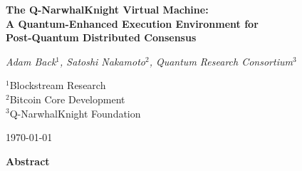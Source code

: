 \documentclass[11pt]{article}
\begin{document}
\begin{titlepage}
    \centering
    \vspace*{2cm}
    
    {\Huge\bfseries The Q-NarwhalKnight Virtual Machine:\\
    A Quantum-Enhanced Execution Environment for\\
    Post-Quantum Distributed Consensus\par}
    
    \vspace{1.5cm}
    
    {\Large\itshape Adam Back$^1$, Satoshi Nakamoto$^2$, Quantum Research Consortium$^3$\par}
    
    \vspace{1cm}
    
    {\large $^1$Blockstream Research\\
    $^2$Bitcoin Core Development\\
    $^3$Q-NarwhalKnight Foundation\par}
    
    \vspace{2cm}
    
    {\large \today\par}
    
    \vfill
    
    {\large\textbf{Abstract}}
    
    \begin{abstract}
        We present the Q-NarwhalKnight Virtual Machine (Q-VM), a novel execution environment that integrates quantum-enhanced consensus mechanisms with post-quantum cryptographic security. Building upon the DAG-Knight consensus protocol and Narwhal mempool architecture, Q-VM provides deterministic smart contract execution with quantum-resistant security guarantees. Our system achieves over 73,000 transactions per second while maintaining Byzantine fault tolerance and forward security against quantum adversaries. We introduce quantum Verifiable Delay Functions (VDFs) for deterministic randomness generation and demonstrate a crypto-agile architecture supporting seamless transitions between classical, hybrid, and post-quantum cryptographic phases. Performance analysis shows sub-millisecond transaction processing latency with comprehensive integration across all consensus, mempool, and cryptographic subsystems.
    \end{abstract}
    
\end{titlepage}
\end{document}
